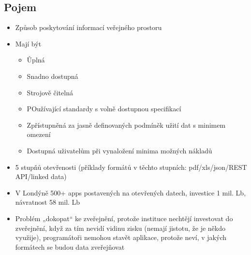 \subsection{Pojem }
\begin{itemize}
      \item Způsob poskytování informací veřejného prostoru
      \item Mají být
            \begin{itemize}
                  \item Ůplná
                  \item Snadno dostupná
                  \item Strojově čitelná
                  \item POužívající standardy s volně dostupnou specifikací
                  \item Zpřístupněná za jasně definovaných podmíněk užití dat s minimem omezení
                  \item Dostupná uživatelům při vynaložení minima možných nákladů
            \end{itemize}
      \item 5 stupňů otevřenosti (příklady formátů v těchto stupních: pdf/xls/json/REST API/linked data)
      \item V Londýně 500+ apps postavených na otevřených datech, investice 1 mil. Lb, návratnost 58
            mil. Lb
      \item Problém „dokopat“ ke zveřejnění, protože instituce nechtějí investovat do zveřejnění, když za
            tím nevidí vidinu zisku (nemají jistotu, že je někdo využije), programátoři nemohou stavět
            aplikace, protože neví, v jakých formátech se budou data zveřejňovat


\end{itemize}


